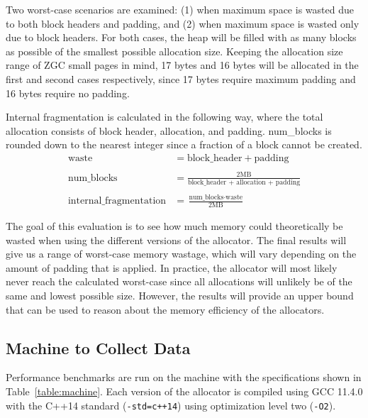 Two worst-case scenarios are examined: (1) when maximum space is wasted due to both block headers and padding, and (2) when maximum space is wasted only due to block headers. For both cases, the heap will be filled with as many blocks as possible of the smallest possible allocation size. Keeping the allocation size range of ZGC small pages in mind, 17 bytes and 16 bytes will be allocated in the first and second cases respectively, since 17 bytes require maximum padding and 16 bytes require no padding.

Internal fragmentation is calculated in the following way, where the total allocation consists of block header, allocation, and padding. num\_blocks is rounded down to the nearest integer since a fraction of a block cannot be created.
\begin{align*}
    \text{waste} &= \text{block\_header} + \text{padding} \\\\
    \text{num\_blocks} &= \frac{2\text{MB}}{\text{block\_header + allocation + padding}} \\\\
    \text{internal\_fragmentation} &= \frac{\text{num\_blocks} \cdot \text{waste}}{2\text{MB}}
\end{align*}

The goal of this evaluation is to see how much memory could theoretically be wasted when using the different versions of the allocator. The final results will give us a range of worst-case memory wastage, which will vary depending on the amount of padding that is applied. In practice, the allocator will most likely never reach the calculated worst-case since all allocations will unlikely be of the same and lowest possible size. However, the results will provide an upper bound that can be used to reason about the memory efficiency of the allocators.

\subsection{Machine to Collect Data}

Performance benchmarks are run on the machine with the specifications shown in Table~\ref{table:machine}. Each version of the allocator is compiled using GCC 11.4.0 with the C++14 standard (\texttt{-std=c++14}) using optimization level two (\texttt{-O2}).

